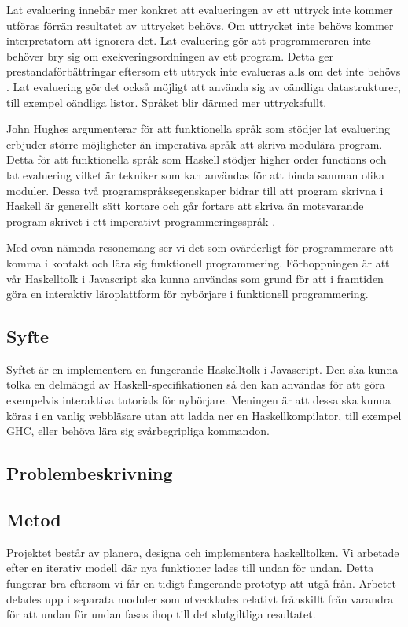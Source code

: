 Lat evaluering innebär mer konkret att evalueringen av ett uttryck inte kommer utföras förrän resultatet av uttrycket behövs. Om uttrycket inte behövs  kommer interpretatorn att ignorera det. 
Lat evaluering gör att programmeraren inte behöver bry sig om exekveringsordningen av ett program. Detta ger prestandaförbättringar eftersom ett uttryck inte evalueras alls om det inte behövs \citep{hudak89}.
Lat evaluering gör det också möjligt att använda sig av oändliga datastrukturer, till exempel oändliga listor. Språket blir därmed mer uttrycksfullt. 

John Hughes argumenterar för att  funktionella språk som stödjer lat evaluering erbjuder större möjligheter än imperativa språk att skriva modulära program. Detta för att funktionella språk som Haskell stödjer higher order functions och lat evaluering vilket är tekniker som kan användas för att binda samman olika moduler.
Dessa två programspråksegenskaper bidrar till att program skrivna i Haskell är generellt sätt kortare och går fortare att skriva än motsvarande program skrivet i ett imperativt programmeringsspråk  \citep{why}.

Med ovan nämnda resonemang ser vi det som ovärderligt för programmerare att komma i kontakt och lära sig funktionell programmering. 
Förhoppningen är att vår Haskelltolk i Javascript ska kunna användas som grund för att i framtiden göra en interaktiv läroplattform för nybörjare i funktionell programmering. 


\subsection{Syfte}
Syftet är en implementera en fungerande Haskelltolk i Javascript. Den ska kunna tolka en delmängd av Haskell-specifikationen så den kan användas för att göra exempelvis interaktiva tutorials för nybörjare.
Meningen är att dessa ska kunna köras i en vanlig webbläsare utan att ladda ner en Haskellkompilator, till exempel GHC, eller behöva lära sig svårbegripliga kommandon.

\subsection{Problembeskrivning} 

\subsection{Metod}
Projektet består av planera, designa och implementera haskelltolken. Vi arbetade efter en iterativ modell där nya funktioner lades till undan för undan. Detta fungerar bra eftersom vi får en tidigt fungerande prototyp att utgå från. Arbetet delades upp i separata moduler som utvecklades relativt frånskillt från varandra för att undan för undan fasas ihop till det slutgiltliga resultatet. 

